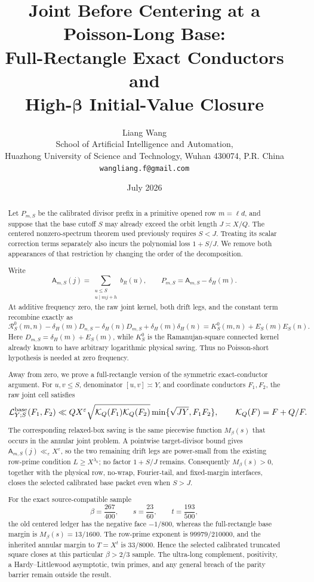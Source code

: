 \documentclass[11pt]{article}
\title{\textbf{Joint Before Centering at a Poisson-Long Base:}\\
\textbf{Full-Rectangle Exact Conductors and}\\
\textbf{High-\(\boldsymbol\beta\) Initial-Value Closure}}
\author{Liang Wang\\
\small School of Artificial Intelligence and Automation,\\[-0.2em]
\small Huazhong University of Science and Technology, Wuhan 430074, P.R. China\\
\small \texttt{wangliang.f@gmail.com}}
\date{July 2026}
\theoremstyle{definition}
\theoremstyle{remark}
\newcommand{\eps}{\varepsilon}
\newcommand{\cK}{\mathcal K}
\newcommand{\cL}{\mathcal L}
\newcommand{\cR}{\mathcal R}
\begin{document}
\maketitle

\begin{abstract}
Let $P_{m,S}$ be the calibrated divisor prefix in a primitive
opened row $m=\ell d$, and suppose that the base cutoff $S$ may
already exceed the orbit length $J\asymp X/Q$.  The centered
nonzero-spectrum theorem used previously requires $S<J$.  Treating
its scalar correction terms separately also incurs the polynomial loss
$1+S/J$.  We remove both appearances of that restriction by changing
the order of the decomposition.

Write
\[
 \mathsf A_{m,S}(j)=
 \sum_{\substack{u\le S\\u\mid mj+h}}b_R(u),
 \qquad P_{m,S}=\mathsf A_{m,S}-\delta_H(m).
\]
At additive frequency zero, the raw joint kernel, both drift legs, and
the constant term recombine exactly as
\[
 \cR_S^0(m,n)-\delta_H(m)D_{n,S}
 -\delta_H(n)D_{m,S}+\delta_H(m)\delta_H(n)
 =K_S^0(m,n)+E_S(m)E_S(n).
\]
Here $D_{m,S}=\delta_H(m)+E_S(m)$, while $K_S^0$ is the
Ramanujan-square connected kernel already known to have arbitrary
logarithmic physical saving.  Thus no Poisson-short hypothesis is
needed at zero frequency.

Away from zero, we prove a full-rectangle version of the symmetric
exact-conductor argument.  For $u,v\le S$, denominator
$[u,v]\asymp Y$, and coordinate conductors $F_1,F_2$, the raw joint
cell satisfies
\[
 \cL^{\rm base}_{Y;S}(F_1,F_2)
 \ll QX^\eps
 \sqrt{\cK_Q(F_1)\cK_Q(F_2)}
 \min\{\sqrt{JY},F_1F_2\},
 \qquad \cK_Q(F)=F+Q/F.
\]
The corresponding relaxed-box saving is the same piecewise function
$M_\beta(s)$ that occurs in the annular joint problem.  A pointwise
target-divisor bound gives
$\mathsf A_{m,S}(j)\ll_\eps X^\eps$, so the two remaining drift legs
are power-small from the existing row-prime condition
$L\ge X^{\lambda_0}$; no factor $1+S/J$ remains.  Consequently
$M_\beta(s)>0$, together with the physical row, no-wrap, Fourier-tail,
and fixed-margin interfaces, closes the selected calibrated base
packet even when $S>J$.

For the exact source-compatible sample
\[
 \beta=\frac{267}{400},\qquad
 s=\frac{23}{60},\qquad
 t=\frac{193}{500},
\]
the old centered ledger has the negative face $-1/800$, whereas the
full-rectangle base margin is $M_\beta(s)=13/1600$.  The row-prime
exponent is $99979/210000$, and the inherited annular margin to
$T=X^t$ is $33/8000$.  Hence the selected calibrated truncated square
closes at this particular $\beta>2/3$ sample.  The ultra-long complement,
positivity, a Hardy--Littlewood asymptotic, twin primes, and any general
breach of the parity barrier remain outside the result.
\end{abstract}
\end{document}
